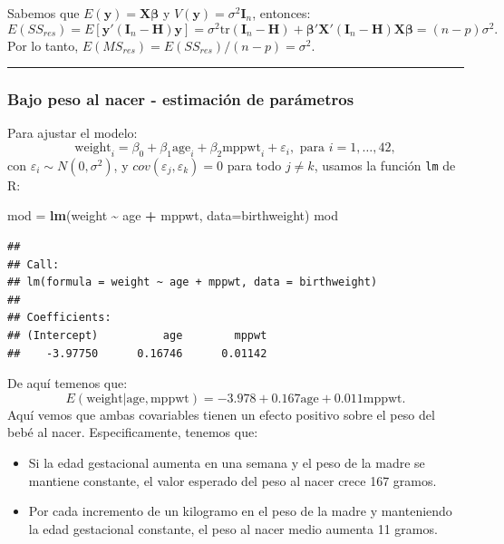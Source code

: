 \documentclass[
]{article}
\newenvironment{Shaded}{\begin{snugshade}}{\end{snugshade}}
\newcommand{\AttributeTok}[1]{\textcolor[rgb]{0.13,0.29,0.53}{#1}}
\newcommand{\FunctionTok}[1]{\textcolor[rgb]{0.13,0.29,0.53}{\textbf{#1}}}
\newcommand{\NormalTok}[1]{#1}
\newcommand{\OtherTok}[1]{\textcolor[rgb]{0.56,0.35,0.01}{#1}}
\newcommand{\SpecialCharTok}[1]{\textcolor[rgb]{0.81,0.36,0.00}{\textbf{#1}}}
\providecommand{\tightlist}{%
  \setlength{\itemsep}{0pt}\setlength{\parskip}{0pt}}
\begin{document}
Sabemos que \(E(\boldsymbol y) = \boldsymbol X\boldsymbol \beta\) y \(V(\boldsymbol y) = \sigma^{2}\boldsymbol I_{n}\), entonces:
\[
E(SS_{res}) = E\left[\boldsymbol y'(\boldsymbol I_{n} - \boldsymbol H)\boldsymbol y\right] = \sigma^{2}\mbox{tr}\left( \boldsymbol I_{n} - \boldsymbol H\right) + \boldsymbol \beta'\boldsymbol X'(\boldsymbol I_{n} - \boldsymbol H)\boldsymbol X\boldsymbol \beta= (n-p)\sigma^{2}.
\]
Por lo tanto, \(E(MS_{res}) = E(SS_{res})/(n-p) = \sigma^{2}\).

\rule{\textwidth}{0.4pt}

\hypertarget{bajo-peso-al-nacer---estimaciuxf3n-de-paruxe1metros}{%
\subsubsection{Bajo peso al nacer - estimación de parámetros}\label{bajo-peso-al-nacer---estimaciuxf3n-de-paruxe1metros}}

Para ajustar el modelo:
\[
\mbox{weight}_{i} = \beta_{0} + \beta_{1}\mbox{age}_{i} + \beta_{2}\mbox{mppwt}_{i} + \varepsilon_{i}, \mbox{ para }i=1,\ldots,42,
\]
con \(\varepsilon_{i}\sim N(0,\sigma^{2})\), y \(cov(\varepsilon_{j},\varepsilon_{k})=0\) para todo \(j\neq k\), usamos la función \texttt{lm} de R:

\begin{Shaded}
\begin{Highlighting}[]
\NormalTok{mod }\OtherTok{=} \FunctionTok{lm}\NormalTok{(weight }\SpecialCharTok{\textasciitilde{}}\NormalTok{ age }\SpecialCharTok{+}\NormalTok{ mppwt, }\AttributeTok{data=}\NormalTok{birthweight)}
\NormalTok{mod}
\end{Highlighting}
\end{Shaded}

\begin{verbatim}
## 
## Call:
## lm(formula = weight ~ age + mppwt, data = birthweight)
## 
## Coefficients:
## (Intercept)          age        mppwt  
##    -3.97750      0.16746      0.01142
\end{verbatim}

De aquí temenos que:
\[
E(\mbox{weight} | \mbox{age}, \mbox{mppwt})= -3.978+0.167\mbox{age}+0.011\mbox{mppwt}.
\]
Aquí vemos que ambas covariables tienen un efecto positivo sobre el peso del bebé al nacer. Especificamente, tenemos que:

\begin{itemize}
\tightlist
\item
  Si la edad gestacional aumenta en una semana y el peso de la madre se mantiene constante, el valor esperado del peso al nacer crece 167 gramos.
\item
  Por cada incremento de un kilogramo en el peso de la madre y manteniendo la edad gestacional constante, el peso al nacer medio aumenta 11 gramos.
\end{itemize}
\end{document}
